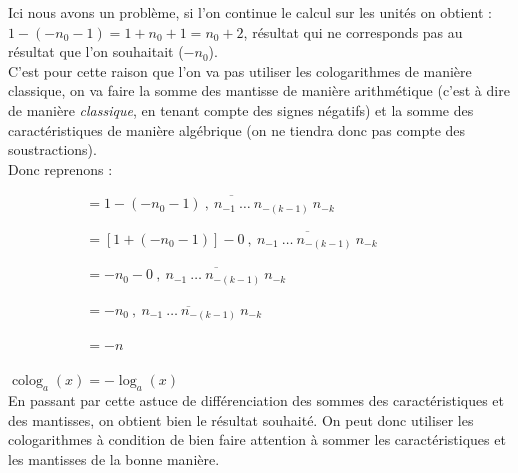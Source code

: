 \documentclass[a4paper]{article}
\begin{document}
\vspace{-2 mm}

Ici nous avons un problème, si l'on continue le calcul sur les unités on obtient : $1 - (-n_{0}-1) = 1 + n_{0} + 1 = n_{0} + 2$, résultat qui ne corresponds pas au résultat que l'on souhaitait ($-n_{0}$).\\

C'est pour cette raison que l'on va pas utiliser les cologarithmes de manière classique, on va faire la somme des mantisse de manière arithmétique (c'est à dire de manière \textit{classique}, en tenant compte des signes négatifs) et la somme des caractéristiques de manière algébrique (on ne tiendra donc pas compte des soustractions).\\

Donc reprenons : 

$\phantom{\operatorname{colog}_a (x)} = 1 - \overline{(-n_{0}-1)~,~n_{-1}~\dots~n_{-(k-1)}~
n_{-k}}  $

\vspace{2 mm}

$\phantom{\operatorname{colog}_a (x)} = [1+(-n_{0}-1)] - \overline{0~,~n_{-1}~\dots~n_{-(k-1)}~
n_{-k}}  $

\vspace{2 mm}

$\phantom{\operatorname{colog}_a (x)} = -n_{0} - \overline{0~,~n_{-1}~\dots~n_{-(k-1)}~
n_{-k}}  $

\vspace{2 mm}

$\phantom{\operatorname{colog}_a (x)} = - \overline{n_{0}~,~n_{-1}~\dots~n_{-(k-1)}~
n_{-k}}  $

\vspace{2 mm}

$\phantom{\operatorname{colog}_a (x)} = - n$

\vspace{2 mm}

$\operatorname{colog}_a (x) = -\log_a(x)$\\

En passant par cette astuce de différenciation des sommes des caractéristiques et des mantisses, on obtient bien le résultat souhaité. On peut donc utiliser les cologarithmes à condition de bien faire attention à sommer les caractéristiques et les mantisses de la bonne manière.
\end{document}

